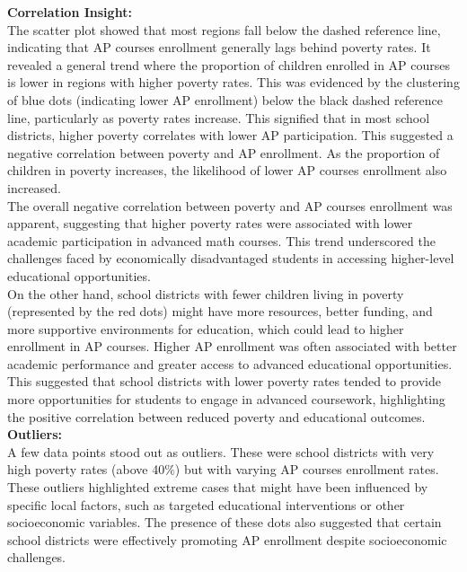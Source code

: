 \documentclass[sn-mathphys-num]{sn-jnl}%
\theoremstyle{thmstyleone}%
\theoremstyle{thmstyletwo}%
\theoremstyle{thmstylethree}%
\begin{document}
{\textbf{Correlation Insight:}\\

The scatter plot showed that most regions fall below the dashed reference line, indicating that AP courses enrollment generally lags behind poverty rates. It revealed a general trend where the proportion of children enrolled in AP courses is lower in regions with higher poverty rates. This was evidenced by the clustering of blue dots (indicating lower AP enrollment) below the black dashed reference line, particularly as poverty rates increase. This signified that in most school districts, higher poverty correlates with lower AP participation. This suggested a negative correlation between poverty and AP enrollment. As the proportion of children in poverty increases, the likelihood of lower AP courses enrollment also increased.\\

The overall negative correlation between poverty and AP courses enrollment was apparent, suggesting that higher poverty rates were associated with lower academic participation in advanced math courses. This trend underscored the challenges faced by economically disadvantaged students in accessing higher-level educational opportunities.\\

On the other hand, school districts with fewer children living in poverty (represented by the red dots) might have more resources, better funding, and more supportive environments for education, which could lead to higher enrollment in AP courses. Higher AP enrollment was often associated with better academic performance and greater access to advanced educational opportunities. This suggested that school districts with lower poverty rates tended to provide more opportunities for students to engage in advanced coursework, highlighting the positive correlation between reduced poverty and educational outcomes.\\

\textbf{Outliers:} \\

A few data points stood out as outliers. These were school districts with very high poverty rates (above 40\%) but with varying AP courses enrollment rates. These outliers highlighted extreme cases that might have been influenced by specific local factors, such as targeted educational interventions or other socioeconomic variables. The presence of these dots also suggested that certain school districts were effectively promoting AP enrollment despite socioeconomic challenges.\\

}
\end{document}
